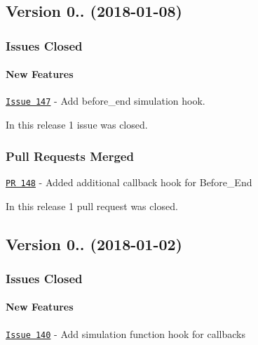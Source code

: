 \subsection*{Version 0.. (2018-\/01-\/08)}

\subsubsection*{Issues Closed}

\paragraph*{New Features}


\begin{DoxyItemize}
\item \href{https://github.com/OpenWaterAnalytics/pyswmm/issues/147}{\tt Issue 147} -\/ Add before\+\_\+end simulation hook.
\end{DoxyItemize}

In this release 1 issue was closed.

\subsubsection*{Pull Requests Merged}


\begin{DoxyItemize}
\item \href{https://github.com/OpenWaterAnalytics/pyswmm/pull/148}{\tt PR 148} -\/ Added additional callback hook for Before\+\_\+\+End
\end{DoxyItemize}

In this release 1 pull request was closed.

\subsection*{Version 0.. (2018-\/01-\/02)}

\subsubsection*{Issues Closed}

\paragraph*{New Features}


\begin{DoxyItemize}
\item \href{https://github.com/OpenWaterAnalytics/pyswmm/issues/140}{\tt Issue 140} -\/ Add simulation function hook for callbacks
\end{DoxyItemize}

